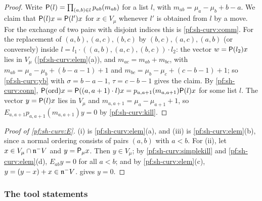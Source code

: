 \begin{proof}
Write $\mathsf P(l)=\prod_{(a,b)\in l}p_{ab}(m_{ab})$ for a list $l$, with $m_{ab}=\mu_a-\mu_b+b-a$. We claim that
$\mathsf P(l)x=\mathsf P(l')x$ for $x\in V_\mu$ whenever $l'$ is obtained from $l$ by a move. For the exchange of two pairs
with disjoint indices this is \cref{pf:sh-curv:comm}. For the replacement of $(a,b),(a,c),(b,c)$ by $(b,c),(a,c),(a,b)$
(or conversely) inside $l=l_1\cdot((a,b),(a,c),(b,c))\cdot l_2$: the vector $w=\mathsf P(l_2)x$ lies in $V_\mu$
(\cref{pf:sh-curv:elem}(a)), and $m_{ac}=m_{ab}+m_{bc}$, with $m_{ab}=\mu_a-\mu_b+(b-a-1)+1$ and
$m_{bc}=\mu_b-\mu_c+(c-b-1)+1$; so \cref{pf:sh-curv:yb} with $\sigma=b-a-1$, $\tau=c-b-1$ gives the claim. By
\cref{pf:sh-curv:conn}, $\mathsf P(\mathrm{ord})x=\mathsf P((a,a+1)\cdot l)x=p_{a,a+1}(m_{a,a+1})\mathsf P(l)x$ for some list
$l$. The vector $y=\mathsf P(l)x$ lies in $V_\mu$ and $m_{a,a+1}=\mu_a-\mu_{a+1}+1$, so $E_{a,a+1}p_{a,a+1}(m_{a,a+1})y=0$ by
\cref{pf:sh-curv:kill}.
\end{proof}

\begin{proof}[Proof of \cref{pf:sh-curv:E}]
(i) is \cref{pf:sh-curv:elem}(a), and (iii) is \cref{pf:sh-curv:elem}(b), since a normal ordering consists of pairs $(a,b)$
with $a<b$. For (ii), let $x\in V_\mu\cap\mathfrak n^- V$ and $y=\mathsf P_\mu x$. Then $y\in V_\mu$; by
\cref{pf:sh-curv:simplekill} and \cref{pf:sh-curv:elem}(d), $E_{ab}y=0$ for all $a<b$; and by \cref{pf:sh-curv:elem}(c),
$y=(y-x)+x\in\mathfrak n^- V$.  gives $y=0$.
\end{proof}

\subsubsection{The tool statements}

